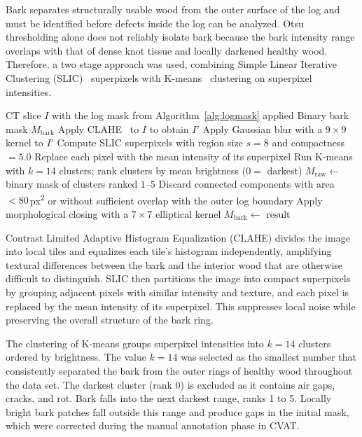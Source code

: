 Bark separates structurally usable wood from the outer surface of the log and must be identified before defects inside the log can be analyzed. Otsu thresholding alone does not reliably isolate bark because the bark intensity range overlaps with that of dense knot tissue and locally darkened healthy wood. Therefore, a two stage approach was used, combining Simple Linear Iterative Clustering (SLIC)~\cite{achanta2012slic} superpixels with K-means~\cite{macqueen1967kmeans} clustering on superpixel intensities.

\begin{algorithm}[H]
\caption{Bark initial segmentation per CT slice}
\label{alg:bark}
\begin{algorithmic}[1]
\Require CT slice $I$ with the log mask from Algorithm~\ref{alg:logmask} applied
\Ensure Binary bark mask $M_\text{bark}$
\State Apply CLAHE~\cite{zuiderveld1994clahe} to $I$ to obtain $I'$
\State Apply Gaussian blur with a $9 \times 9$ kernel to $I'$
\State Compute SLIC superpixels with region size $s = 8$ and compactness $= 5.0$
\State Replace each pixel with the mean intensity of its superpixel
\State Run K-means with $k = 14$ clusters; rank clusters by mean brightness ($0 =$ darkest)
\State $M_\text{raw} \gets$ binary mask of clusters ranked $1$--$5$
\State Discard connected components with area $< 80$\,px\textsuperscript{2} or without sufficient overlap with the outer log boundary
\State Apply morphological closing with a $7 \times 7$ elliptical kernel
\State $M_\text{bark} \gets$ result
\end{algorithmic}
\end{algorithm}

Contrast Limited Adaptive Histogram Equalization (CLAHE) divides the image into local tiles and equalizes each tile's histogram independently, amplifying textural differences between the bark and the interior wood that are otherwise difficult to distinguish. SLIC then partitions the image into compact superpixels by grouping adjacent pixels with similar intensity and texture, and each pixel is replaced by the mean intensity of its superpixel. This suppresses local noise while preserving the overall structure of the bark ring.

The clustering of K-means groups superpixel intensities into $k = 14$ clusters ordered by brightness. The value $k = 14$ was selected as the smallest number that consistently separated the bark from the outer rings of healthy wood throughout the data set. The darkest cluster (rank 0) is excluded as it contains air gaps, cracks, and rot. Bark falls into the next darkest range, ranks 1 to 5. Locally bright bark patches fall outside this range and produce gaps in the initial mask, which were corrected during the manual annotation phase in CVAT.

